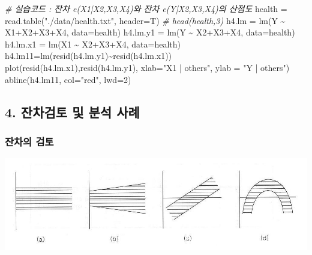 \documentclass[
]{article}
\newenvironment{Shaded}{\begin{snugshade}}{\end{snugshade}}
\newcommand{\AttributeTok}[1]{\textcolor[rgb]{0.77,0.63,0.00}{#1}}
\newcommand{\CommentTok}[1]{\textcolor[rgb]{0.56,0.35,0.01}{\textit{#1}}}
\newcommand{\DecValTok}[1]{\textcolor[rgb]{0.00,0.00,0.81}{#1}}
\newcommand{\FunctionTok}[1]{\textcolor[rgb]{0.00,0.00,0.00}{#1}}
\newcommand{\NormalTok}[1]{#1}
\newcommand{\OtherTok}[1]{\textcolor[rgb]{0.56,0.35,0.01}{#1}}
\newcommand{\SpecialCharTok}[1]{\textcolor[rgb]{0.00,0.00,0.00}{#1}}
\newcommand{\StringTok}[1]{\textcolor[rgb]{0.31,0.60,0.02}{#1}}
\begin{document}
\begin{itemize}
\begin{Shaded}
\begin{Highlighting}[]
\CommentTok{\# 실습코드 : 잔차 e(X1|X2,X3,X4)와 잔차 e(Y|X2,X3,X4)의 산점도}
\NormalTok{health }\OtherTok{=} \FunctionTok{read.table}\NormalTok{(}\StringTok{"./data/health.txt"}\NormalTok{, }\AttributeTok{header=}\NormalTok{T)}
\CommentTok{\# head(health,3)}
\NormalTok{h4.lm }\OtherTok{=} \FunctionTok{lm}\NormalTok{(Y }\SpecialCharTok{\textasciitilde{}}\NormalTok{ X1}\SpecialCharTok{+}\NormalTok{X2}\SpecialCharTok{+}\NormalTok{X3}\SpecialCharTok{+}\NormalTok{X4, }\AttributeTok{data=}\NormalTok{health)}
\NormalTok{h4.lm.y1 }\OtherTok{=} \FunctionTok{lm}\NormalTok{(Y }\SpecialCharTok{\textasciitilde{}}\NormalTok{ X2}\SpecialCharTok{+}\NormalTok{X3}\SpecialCharTok{+}\NormalTok{X4, }\AttributeTok{data=}\NormalTok{health)}
\NormalTok{h4.lm.x1 }\OtherTok{=} \FunctionTok{lm}\NormalTok{(X1 }\SpecialCharTok{\textasciitilde{}}\NormalTok{ X2}\SpecialCharTok{+}\NormalTok{X3}\SpecialCharTok{+}\NormalTok{X4, }\AttributeTok{data=}\NormalTok{health)}
\NormalTok{h4.lm11}\OtherTok{=}\FunctionTok{lm}\NormalTok{(}\FunctionTok{resid}\NormalTok{(h4.lm.y1)}\SpecialCharTok{\textasciitilde{}}\FunctionTok{resid}\NormalTok{(h4.lm.x1))}
\FunctionTok{plot}\NormalTok{(}\FunctionTok{resid}\NormalTok{(h4.lm.x1),}\FunctionTok{resid}\NormalTok{(h4.lm.y1), }\AttributeTok{xlab=}\StringTok{"X1 | others"}\NormalTok{, }\AttributeTok{ylab =} \StringTok{"Y | others"}\NormalTok{)}
\FunctionTok{abline}\NormalTok{(h4.lm11, }\AttributeTok{col=}\StringTok{"red"}\NormalTok{, }\AttributeTok{lwd=}\DecValTok{2}\NormalTok{)}
\end{Highlighting}
\end{Shaded}
\end{itemize}

\hypertarget{uxc794uxcc28uxac80uxd1a0-uxbc0f-uxbd84uxc11d-uxc0acuxb840}{%
\subsection{4. 잔차검토 및 분석
사례}\label{uxc794uxcc28uxac80uxd1a0-uxbc0f-uxbd84uxc11d-uxc0acuxb840}}

\hypertarget{uxc794uxcc28uxc758-uxac80uxd1a0}{%
\subsubsection{잔차의 검토}\label{uxc794uxcc28uxc758-uxac80uxd1a0}}

\includegraphics{5강 제2장 중회귀모형-2 8bcef66ab07b4fd6b163768d59a06c84/Untitled.png}
\end{document}
